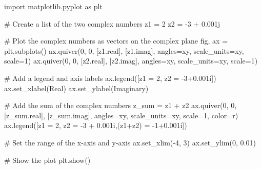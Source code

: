 \documentclass[
  letterpaper,
  DIV=11,
  numbers=noendperiod]{scrartcl}
\newenvironment{Shaded}{\begin{snugshade}}{\end{snugshade}}
\newcommand{\CommentTok}[1]{\textcolor[rgb]{0.37,0.37,0.37}{#1}}
\newcommand{\DecValTok}[1]{\textcolor[rgb]{0.68,0.00,0.00}{#1}}
\newcommand{\FloatTok}[1]{\textcolor[rgb]{0.68,0.00,0.00}{#1}}
\newcommand{\ImportTok}[1]{\textcolor[rgb]{0.00,0.46,0.62}{#1}}
\newcommand{\NormalTok}[1]{\textcolor[rgb]{0.00,0.23,0.31}{#1}}
\newcommand{\OperatorTok}[1]{\textcolor[rgb]{0.37,0.37,0.37}{#1}}
\newcommand{\OtherTok}[1]{\textcolor[rgb]{0.00,0.23,0.31}{#1}}
\newcommand{\StringTok}[1]{\textcolor[rgb]{0.13,0.47,0.30}{#1}}
\begin{document}
\begin{Shaded}
\begin{Highlighting}[numbers=left,,]
\ImportTok{import}\NormalTok{ matplotlib.pyplot }\ImportTok{as}\NormalTok{ plt}

\CommentTok{\# Create a list of the two complex numbers}
\NormalTok{z1 }\OperatorTok{=} \DecValTok{2}
\NormalTok{z2 }\OperatorTok{=} \OperatorTok{{-}}\DecValTok{3} \OperatorTok{+} \OtherTok{0.001j}

\CommentTok{\# Plot the complex numbers as vectors on the complex plane}
\NormalTok{fig, ax }\OperatorTok{=}\NormalTok{ plt.subplots()}
\NormalTok{ax.quiver(}\DecValTok{0}\NormalTok{, }\DecValTok{0}\NormalTok{, [z1.real], [z1.imag], angles}\OperatorTok{=}\StringTok{\textquotesingle{}xy\textquotesingle{}}\NormalTok{, scale\_units}\OperatorTok{=}\StringTok{\textquotesingle{}xy\textquotesingle{}}\NormalTok{, scale}\OperatorTok{=}\DecValTok{1}\NormalTok{)}
\NormalTok{ax.quiver(}\DecValTok{0}\NormalTok{, }\DecValTok{0}\NormalTok{, [z2.real], [z2.imag], angles}\OperatorTok{=}\StringTok{\textquotesingle{}xy\textquotesingle{}}\NormalTok{, scale\_units}\OperatorTok{=}\StringTok{\textquotesingle{}xy\textquotesingle{}}\NormalTok{, scale}\OperatorTok{=}\DecValTok{1}\NormalTok{)}

\CommentTok{\# Add a legend and axis labels}
\NormalTok{ax.legend([}\StringTok{\textquotesingle{}z1 = 2\textquotesingle{}}\NormalTok{, }\StringTok{\textquotesingle{}z2 = {-}3+0.001i\textquotesingle{}}\NormalTok{])}
\NormalTok{ax.set\_xlabel(}\StringTok{\textquotesingle{}Real\textquotesingle{}}\NormalTok{)}
\NormalTok{ax.set\_ylabel(}\StringTok{\textquotesingle{}Imaginary\textquotesingle{}}\NormalTok{)}

\CommentTok{\# Add the sum of the complex numbers}
\NormalTok{z\_sum }\OperatorTok{=}\NormalTok{ z1 }\OperatorTok{+}\NormalTok{ z2}
\NormalTok{ax.quiver(}\DecValTok{0}\NormalTok{, }\DecValTok{0}\NormalTok{, [z\_sum.real], [z\_sum.imag], angles}\OperatorTok{=}\StringTok{\textquotesingle{}xy\textquotesingle{}}\NormalTok{, scale\_units}\OperatorTok{=}\StringTok{\textquotesingle{}xy\textquotesingle{}}\NormalTok{, scale}\OperatorTok{=}\DecValTok{1}\NormalTok{, color}\OperatorTok{=}\StringTok{\textquotesingle{}r\textquotesingle{}}\NormalTok{)}
\NormalTok{ax.legend([}\StringTok{\textquotesingle{}z1 = 2\textquotesingle{}}\NormalTok{, }\StringTok{\textquotesingle{}z2 = {-}3 + 0.001i\textquotesingle{}}\NormalTok{,}\StringTok{\textquotesingle{}(z1+z2) = {-}1+0.001i\textquotesingle{}}\NormalTok{])}

\CommentTok{\# Set the range of the x{-}axis and y{-}axis}
\NormalTok{ax.set\_xlim(}\OperatorTok{{-}}\DecValTok{4}\NormalTok{, }\DecValTok{3}\NormalTok{)}
\NormalTok{ax.set\_ylim(}\DecValTok{0}\NormalTok{, }\FloatTok{0.01}\NormalTok{)}

\CommentTok{\# Show the plot}
\NormalTok{plt.show()}
\end{Highlighting}
\end{Shaded}
\end{document}
